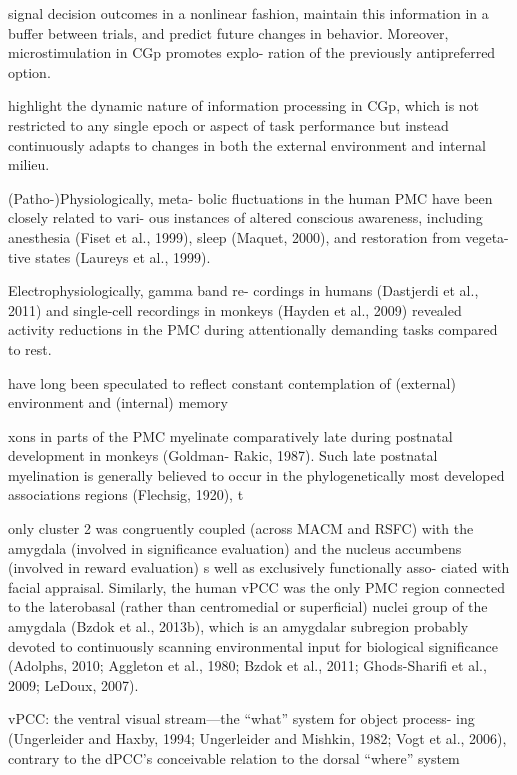 \documentclass{article} %
\begin{document}
signal decision outcomes in a nonlinear fashion, maintain this information in a buffer between trials, and predict future changes in behavior. Moreover, microstimulation in CGp promotes explo- ration of the previously antipreferred option. 

highlight the dynamic nature of information processing in CGp, which is not restricted to any single epoch or aspect of task performance but instead continuously adapts to changes in both the external environment and internal milieu.




(Patho-)Physiologically, meta- bolic fluctuations in the human PMC have been closely related to vari- ous instances of altered conscious awareness, including anesthesia (Fiset et al., 1999), sleep (Maquet, 2000), and restoration from vegeta- tive states (Laureys et al., 1999).

Electrophysiologically, gamma band re- cordings in humans (Dastjerdi et al., 2011) and single-cell recordings in monkeys (Hayden et al., 2009) revealed activity reductions in the PMC during attentionally demanding tasks compared to rest. 

 have long been speculated to reflect constant contemplation of (external) environment and (internal) memory

xons in parts of the PMC myelinate comparatively late during postnatal development in monkeys (Goldman- Rakic, 1987). Such late postnatal myelination is generally believed to occur in the phylogenetically most developed associations regions (Flechsig, 1920), t



only cluster 2 was congruently coupled (across MACM and RSFC) with the amygdala (involved in significance evaluation) and the nucleus accumbens (involved in reward evaluation) 
s well as exclusively functionally asso- ciated with facial appraisal. Similarly, the human vPCC was the only PMC region connected to the laterobasal (rather than centromedial or superficial) nuclei group of the amygdala (Bzdok et al., 2013b), which is an amygdalar subregion probably devoted to continuously scanning environmental input for biological significance (Adolphs, 2010; Aggleton et al., 1980; Bzdok et al., 2011; Ghods-Sharifi et al., 2009; LeDoux, 2007).


vPCC:
the ventral visual stream—the “what” system for object process- ing (Ungerleider and Haxby, 1994; Ungerleider and Mishkin, 1982; Vogt et al., 2006), contrary to the dPCC's conceivable relation to the dorsal “where” system 
\end{document}
